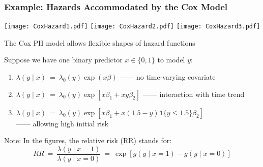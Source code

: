 \documentclass{beamer}
\begin{document}
\begin{frame}
\frametitle{Example: Hazards Accommodated by the Cox Model}
\begin{center}
\texttt{[image: CoxHazard1.pdf]}%
\texttt{[image: CoxHazard2.pdf]}%
\texttt{[image: CoxHazard3.pdf]}
\end{center}
\begin{itemize}
\item The Cox PH model allows flexible shapes of hazard functions
\medskip
\item Suppose we have one binary predictor $x \in \{0,1\}$ to model $y$:
\smallskip
\begin{enumerate}
\addtolength{\itemsep}{.25\baselineskip}
\item $\lambda(y\mid x) \ = \ \lambda_0(y) \exp(x\beta)$ \hfill ------ no time-varying covariate
\item $\lambda(y\mid x) \ = \ \lambda_0(y) \exp\left[x\beta_1 + xy\beta_2\right]$ \hfill ------ interaction with time trend
\item $\lambda(y\mid x) \ = \ \lambda_0(y) \exp\left[x \beta_1 + x(1.5-y)\boldsymbol{1}\{y\leq 1.5\}\beta_2\right]$ \\
      \flushright ------ allowing high initial risk
\end{enumerate}
\medskip
{\footnotesize
\item[] Note: In the figures, the \alert{relative risk} (RR) stands for:
$$ RR \ = \  \frac{\lambda(y\mid x=1)}{\lambda(y\mid x=0)}
      \ = \ \exp\left[g(y\mid x=1) - g(y\mid x=0)\right]$$
}
\end{itemize}
\end{frame}
\end{document}
